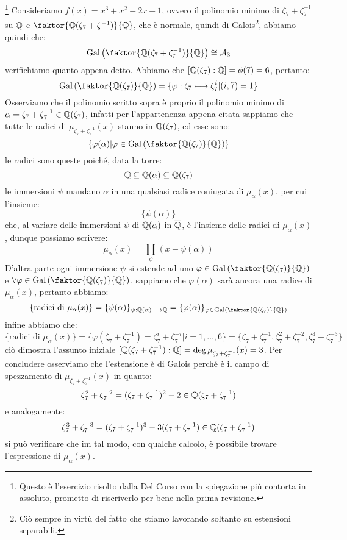 \documentclass[11pt]{scrartcl}
\begin{document}
\begin{example}
\footnote{Questo è l'esercizio risolto dalla Del Corso con la spiegazione più contorta in assoluto, prometto di riscriverlo per bene nella prima revisione.}
Consideriamo $f(x) = x^3 + x^2 - 2x -1$, ovvero il polinomio minimo di $\zeta_7+\zeta_7^{-1}$ su $\mathbb Q$ e $\faktor{\QQ(\zeta_7+\zeta^{-1})}{\QQ}$, che è normale, quindi 
di Galois\footnote{Ciò sempre in virtù del fatto che stiamo lavorando soltanto su estensioni separabili.}, abbiamo quindi che:
\[ \Gal\left(\faktor{\QQ(\zeta_7+\zeta_7^{-1})}{\QQ}\right) \cong \mathcal{A}_3
    \]
verifichiamo quanto appena detto. Abbiamo che $[\mathbb Q(\zeta_7) : \mathbb Q] = \phi(7) = 6$, pertanto:
\[ \Gal\left(\faktor{\QQ(\zeta_7)}{\QQ}\right) = \{\varphi : \zeta_7 \longmapsto \zeta_7^i | (i,7) = 1\}
    \]
Osserviamo che il polinomio scritto sopra è proprio il polinomio minimo di $\alpha = \zeta_7+\zeta_7^{-1} \in \mathbb Q(\zeta_7)$, infatti per l'appartenenza appena citata sappiamo che tutte le radici
di $\mu_{\zeta_7+\zeta_7^{-1}}(x)$ stanno in $\mathbb Q(\zeta_7)$, ed esse sono:
\[ \left\{\varphi(\alpha) \m \varphi \in \Gal\left(\faktor{\QQ(\zeta_7)}{\QQ}\right) \right\}
    \]
le radici sono queste poiché, data la torre:
\[ \mathbb Q \subseteq \mathbb Q(\alpha) \subseteq \mathbb Q(\zeta_7)
    \]
le immersioni $\psi$ mandano $\alpha$ in una qualsiasi radice coniugata di $\mu_{\alpha}(x)$, per cui l'insieme:
\[ \{\psi(\alpha)\}
    \]
che, al variare delle immersioni $\psi$ di $\mathbb Q(\alpha)$ in $\overline {\mathbb Q}$, è l'insieme delle radici di $\mu_\alpha(x)$, dunque possiamo scrivere:
\[ \mu_\alpha(x) = \prod_{\psi}(x - \psi(\alpha))
    \]
D'altra parte ogni immersione $\psi$ si estende ad uno $\varphi \in \Gal\left(\faktor{\QQ(\zeta_7)}{\QQ}\right)$ e $\forall \varphi \in \Gal\left(\faktor{\QQ(\zeta_7)}{\QQ}\right)$, sappiamo che 
$\varphi(\alpha)$ sarà ancora una radice di $\mu_\alpha(x)$, pertanto abbiamo:
\[ \{\text{radici di $\mu_\alpha(x)$}\} = \{\psi(\alpha)\}_{\psi : \QQ(\alpha) \longrightarrow \QQ} = \{\varphi(\alpha)\}_{\varphi \in \Gal\left(\faktor{\QQ(\zeta_7)}{\QQ}\right)}
    \]
infine abbiamo che:
\[  \{\text{radici di $\mu_\alpha(x)$}\} = \{\varphi(\zeta_7+\zeta_7^{-1}) = \zeta_7^i+\zeta_7^{-i} | i = 1,\ldots,6\} = \{\zeta_7+\zeta_7^{-1}, \zeta_7^2+\zeta_7^{-2},\zeta_7^3+\zeta_7^{-3}\}
    \]
ciò dimostra l'assunto iniziale $[\mathbb Q(\zeta_7+\zeta_7^{-1}) : \mathbb Q] = \deg \mu_{\zeta_7+\zeta_7^{-1}}(x) = 3$. Per concludere osserviamo che l'estensione è di Galois perché è il campo di spezzamento di $\mu_{\zeta_7+\zeta_7^{-1}}(x)$ in quanto:
\[ \zeta_7^2+\zeta_7^{-2} = (\zeta_7+\zeta_7^{-1})^2 - 2 \in \mathbb Q(\zeta_7+\zeta_7^{-1})
    \]
e analogamente:
\[ \zeta_7^3+\zeta_7^{-3} = (\zeta_7+\zeta_7^{-1})^3 - 3(\zeta_7+\zeta_7^{-1}) \in \mathbb Q(\zeta_7+\zeta_7^{-1})
    \]
si può verificare che im tal modo, con qualche calcolo, è possibile trovare l'espressione di $\mu_\alpha(x)$.
\end{example}
\end{document}
